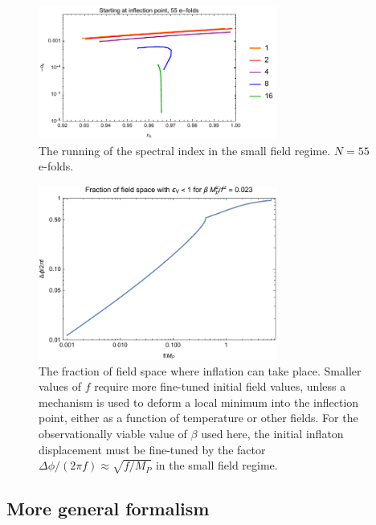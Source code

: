 \documentclass[aps,amsfonts,amsmath,prd,preprint,nofootinbib]{revtex4}
\newcommand{\Mp}{{M_{P}}}
\begin{document}
\begin{figure}[!h]
  \centering
    \includegraphics[width=0.7\textwidth]{figures/alphasvsnsplot.pdf}
    \caption{The running of the spectral index in the small field regime.  $N = 55$ e-folds.}
\end{figure}





\begin{figure}[!h]
  \centering
    \includegraphics[width=0.7\textwidth]{figures/SRfraction.pdf}
    \caption{The fraction of field space where inflation can take place.  Smaller values of $f$ require more fine-tuned initial field values, unless a 
    mechanism is used to deform a local minimum into the inflection point, either
    as a function of temperature or other fields.  For the observationally viable value of $\beta$ used here, the initial inflaton displacement must be fine-tuned by the factor $\Delta\phi/(2\pi f) \approx \sqrt{f/\Mp}$ in the small field regime.}
\end{figure}







\subsection{More general formalism}
\end{document}
